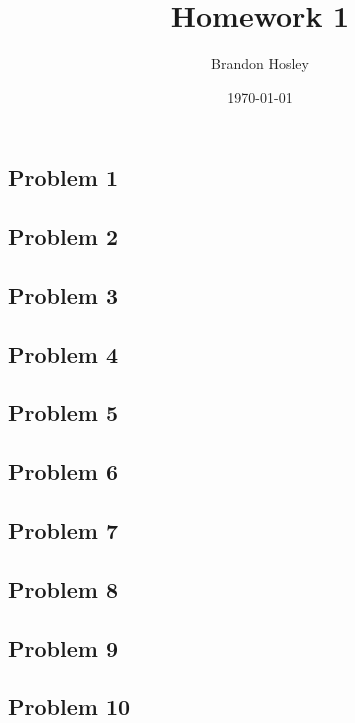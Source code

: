 \documentclass[a4paper,man,natbib]{apa6}
\title{Homework 1}
\author{Brandon Hosley}
\date{\today}
\affiliation{STAT 587 - Introduction to Probability and Statistics}
\begin{document}
\maketitle
\raggedbottom
\singlespacing

\subsection{Problem 1}
\emph{}



\subsection{Problem 2}
\emph{}


\subsection{Problem 3}
\emph{}



\subsection{Problem 4}
\emph{}



\subsection{Problem 5}
\emph{  }\vspace{1em}


\subsection{Problem 6}
\emph{} \vspace{1em}


\subsection{Problem 7}
\emph{}\vspace{1em}
 
 
 
\subsection{Problem 8}
\emph{ }\vspace{1em}


\subsection{Problem 9}
\emph{ }\vspace{1em}


\subsection{Problem 10}
\emph{} \vspace{1em}
\end{document}
